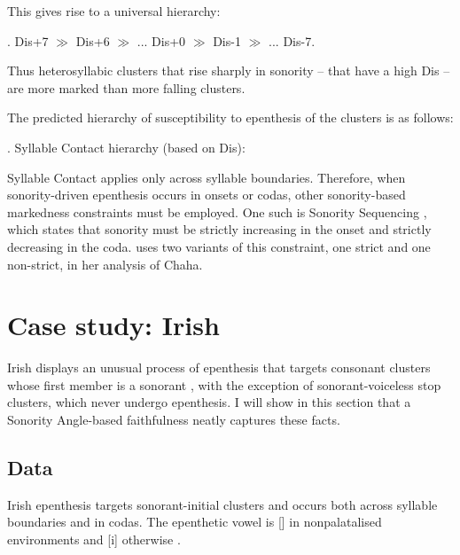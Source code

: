\documentclass[12pt]{article}
\begin{document}
This gives rise to a universal hierarchy:

\ex. {\sc *Dis+7} $\gg$ {\sc *Dis+6} $\gg$ ... {\sc *Dis+0} $\gg$ {\sc *Dis-1} $\gg$ ... {\sc *Dis-7}.

Thus heterosyllabic clusters that rise sharply in sonority -- that have a high {\sc Dis} -- are more marked than more falling clusters.

The predicted hierarchy of susceptibility to epenthesis of the clusters is as follows:

\ex. Syllable Contact hierarchy (based on {\sc *Dis}):

\vspace{-3em}
\noindent \resizebox{\linewidth}{!}{\usebox{\syllablecontacthierarchy}}

\bigskip

Syllable Contact applies only across syllable boundaries.  Therefore, when sonority-driven epenthesis occurs in onsets or codas, other sonority-based markedness constraints must be employed.  One such is  Sonority Sequencing \citep{selkirk.1984}, which states that sonority must be strictly increasing in the onset and strictly decreasing in the coda. \citep{rose.2000} uses two variants of this constraint, one strict and one non-strict, in her analysis of Chaha.



\section{Case study: Irish} \label{irish}

Irish displays an unusual process of epenthesis that targets consonant clusters 
whose first member is a sonorant \citep{carnie.1994, ni.chiosain.1999}, with the 
exception of sonorant-voiceless stop clusters, which never undergo epenthesis. 
I will show in this section that a {\sc Sonority Angle}-based faithfulness
neatly captures these facts.

\subsection{Data}

Irish epenthesis targets sonorant-initial clusters and occurs both across syllable boundaries and in codas.  The epenthetic vowel is [] in nonpalatalised environments and [i] otherwise \citep{ni.chiosain.1999}.
\end{document}
